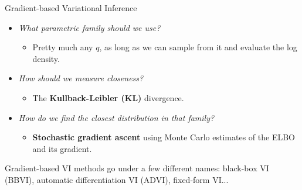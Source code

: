 \documentclass[aspectratio=169]{beamer}
\begin{document}
\begin{frame}{Gradient-based Variational Inference}

\begin{itemize}
    \item \textit{What parametric family should we use? }
    \begin{itemize}
        \item Pretty much any $q$, as long as we can sample from it and evaluate the log density.
    \end{itemize}
    
    \item \textit{How should we measure closeness? }
    \begin{itemize}
        \item The \textbf{Kullback-Leibler (KL)} divergence.
    \end{itemize}
    
    \item \textit{How do we find the closest distribution in that family?}
    \begin{itemize}
        \item \textbf{Stochastic gradient ascent} using Monte Carlo estimates of the ELBO and its gradient.
    \end{itemize}
\end{itemize}

Gradient-based VI methods go under a few different names: black-box VI (BBVI), automatic differentiation VI (ADVI), fixed-form VI...

\end{frame}
    
    
    
    
\end{document}
